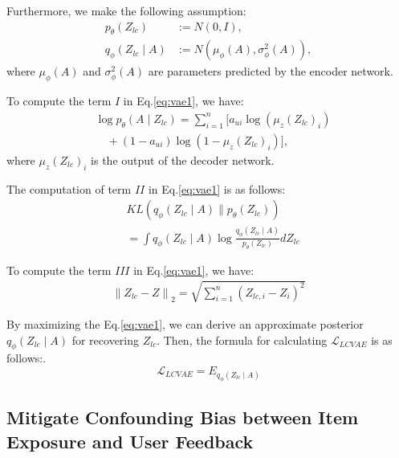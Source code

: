 \documentclass[sigconf]{acmart}
\begin{document}
Furthermore, we make the following assumption:
\begin{equation}
\begin{aligned}
p_\theta(Z_{lc}) & := {N}(0, I), \\
q_\phi(Z_{lc} \mid A) & := {N}(\mu_\phi(A), \sigma_\phi^2(A)),
\end{aligned}
\end{equation}
where \(\mu_\phi(A)\) and \(\sigma_\phi^2(A)\) are parameters predicted by the encoder network.



To compute the term $I$ in Eq.\eqref{eq:vae1}, we have:
\begin{equation}
\begin{aligned}
&\log p_\theta(A \mid Z_{lc}) = \sum_{i=1}^n \biggl[a_{ui} \log(\mu_z(Z_{lc})_i) \\
&\quad + (1 - a_{ui}) \log(1 - \mu_z(Z_{lc})_i)\biggr],
\end{aligned}
\end{equation}
where \(\mu_z(Z_{lc})_i\) is the output of the decoder network.


The computation of term $II$ in Eq.\eqref{eq:vae1} is as follows:
\begin{equation}
\begin{aligned}
&{KL}\left(q_\phi(Z_{lc} \mid A) \parallel p_\theta(Z_{lc})\right) \\
&= \int q_\phi\left(Z_{lc} \mid A\right) \log \frac{q_\phi\left(Z_{lc} \mid A\right)}{p_\theta\left(Z_{lc}\right)} d Z_{lc}
\end{aligned}
\end{equation} 


To compute the term $III$ in Eq.\eqref{eq:vae1}, we have:
\begin{equation}
\begin{aligned}
\left\|Z_{lc}-Z\right\|_2=\sqrt{\sum_{i=1}^n\left(Z_{{lc}, i}-Z_{i}\right)^2}
\end{aligned}
\end{equation}

By maximizing the Eq.\eqref{eq:vae1}, we can derive an approximate posterior 
\(q_\phi(Z_{lc} \mid A)\) for recovering ${Z_{lc}}$.
Then, the formula for calculating $\mathcal{L}_{LCVAE}$ is as follows:.
\begin{equation}
\mathcal{L}_{LCVAE} = E_{q_\phi\left({Z}_{lc} \mid {A}\right)}
\end{equation}




\subsection{Mitigate Confounding Bias between Item
Exposure and User Feedback}
\end{document}
